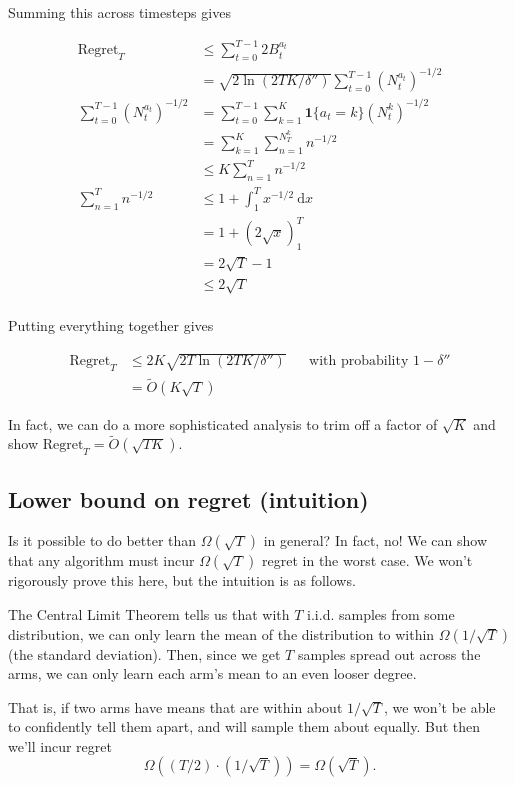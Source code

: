 \documentclass[
  letterpaper,
  DIV=11,
  numbers=noendperiod]{scrreprt}
\theoremstyle{plain}
\theoremstyle{plain}
\theoremstyle{definition}
\theoremstyle{definition}
\theoremstyle{remark}
\begin{document}
Summing this across timesteps gives

\[
\begin{aligned}
    \text{Regret}_T &\le \sum_{t=0}^{T-1} 2 B^{a_t}_t \\
    &= \sqrt{2\ln(2TK/\delta'')} \sum_{t=0}^{T-1} (N^{a_t}_t)^{-1/2} \\
    \sum_{t=0}^{T-1} (N^{a_t}_t)^{-1/2} &= \sum_{t=0}^{T-1} \sum_{k=1}^K \mathbf{1}\{ a_t = k \} (N^k_t)^{-1/2} \\
    &= \sum_{k=1}^K \sum_{n=1}^{N_T^k} n^{-1/2} \\
    &\le K \sum_{n=1}^T n^{-1/2} \\
    \sum_{n=1}^T n^{-1/2} &\le 1 + \int_1^T x^{-1/2} \ \mathrm{d}x \\
    &= 1 + (2 \sqrt{x})_1^T \\
    &= 2 \sqrt{T} - 1 \\
    &\le 2 \sqrt{T} \\
\end{aligned}
\]

Putting everything together gives

\[
\begin{aligned}
    \text{Regret}_T &\le 2 K \sqrt{2T \ln(2TK/\delta'')} && \text{with probability } 1-\delta'' \\
    &= \tilde O(K\sqrt{T})
\end{aligned}
\]

In fact, we can do a more sophisticated analysis to trim off a factor of
\(\sqrt{K}\) and show \(\text{Regret}_T = \tilde O(\sqrt{TK})\).

\subsection{Lower bound on regret
(intuition)}\label{lower-bound-on-regret-intuition}

Is it possible to do better than \(\Omega(\sqrt{T})\) in general? In
fact, no! We can show that any algorithm must incur \(\Omega(\sqrt{T})\)
regret in the worst case. We won't rigorously prove this here, but the
intuition is as follows.

The Central Limit Theorem tells us that with \(T\) i.i.d. samples from
some distribution, we can only learn the mean of the distribution to
within \(\Omega(1/\sqrt{T})\) (the standard deviation). Then, since we
get \(T\) samples spread out across the arms, we can only learn each
arm's mean to an even looser degree.

That is, if two arms have means that are within about \(1/\sqrt{T}\), we
won't be able to confidently tell them apart, and will sample them about
equally. But then we'll incur regret
\[\Omega((T/2) \cdot (1/\sqrt{T})) = \Omega(\sqrt{T}).\]
\end{document}
